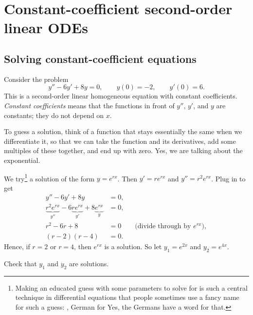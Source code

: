 \sectionnewpage
\section{Constant-coefficient second-order linear ODEs}
\label{sec:ccsol}



\subsection{Solving constant-coefficient equations}

Consider the problem
\begin{equation*}
y''-6y'+8y = 0, \qquad y(0) = - 2, \qquad y'(0) = 6 .
\end{equation*}
This is a second-order linear homogeneous equation with constant
coefficients.  \emph{Constant coefficients}
means that the functions 
in front of $y''$, $y'$, and $y$ are constants; they do not depend on $x$.

To guess a solution, think of a function that stays essentially the
same when we differentiate it, so that we can take the function and its
derivatives, add some multiples of these together, and end up with zero.
Yes, we are talking about the exponential.

We try\footnote{%
Making an educated guess with some parameters to solve for 
is such a central technique in differential equations that people sometimes use
a fancy name for such a guess: \emph{}, German for   Yes, the Germans have a word for that.}
a solution of the form $y = e^{rx}$.  Then $y' = r e^{rx}$ and
$y'' = r^2 e^{rx}$.  Plug in to get
\begin{align*}
y''-6y'+8y & = 0 , \\
\underbrace{r^2 e^{rx}}_{y''} -6 \underbrace{r e^{rx}}_{y'}+8 \underbrace{e^{rx}}_{y} & = 0 , \\
r^2 -6 r +8 & = 0 \qquad \text{(divide through by } e^{rx} \text{)},\\
(r-2)(r-4) & = 0 .
\end{align*}
Hence, if $r=2$ or $r=4$, then $e^{rx}$ is a solution.  So let $y_1 = e^{2x}$
and $y_2 = e^{4x}$.

\begin{exercise}
Check that $y_1$ and $y_2$ are solutions.
\end{exercise}

